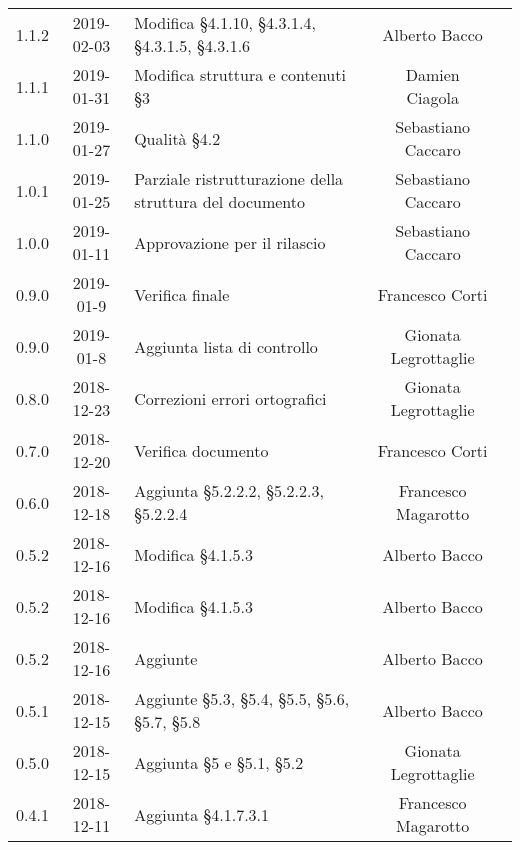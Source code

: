 {\begin{longtable}{ c c C{4cm} c c }
		1.1.2 & 2019-02-03 & Modifica §4.1.10, §4.3.1.4, §4.3.1.5, §4.3.1.6 & Alberto Bacco& \reda{} \\	
		
		1.1.1 & 2019-01-31 & Modifica struttura e contenuti §3 & Damien Ciagola & \reda{} \\	
		
		1.1.0 & 2019-01-27 & Qualità §4.2 & Sebastiano Caccaro & \reda{} \\	
		
		1.0.1 & 2019-01-25 & Parziale ristrutturazione della struttura del documento & Sebastiano Caccaro & \reda{} \\		
		
		1.0.0 & 2019-01-11 & Approvazione per il rilascio & Sebastiano Caccaro & \Res{} \\
		
		0.9.0 & 2019-01-9 & Verifica finale & Francesco Corti & \ver{} \\
		
		0.9.0 & 2019-01-8 & Aggiunta lista di controllo & Gionata Legrottaglie & \reda{} \\
		
		0.8.0 & 2018-12-23 & Correzioni errori ortografici & Gionata Legrottaglie & \reda{} \\
		
		0.7.0 & 2018-12-20 & Verifica documento & Francesco Corti & \ver{}\\
		
		0.6.0 & 2018-12-18 & Aggiunta §5.2.2.2, §5.2.2.3, §5.2.2.4 & Francesco Magarotto & \reda{} \\
		
		0.5.2 & 2018-12-16 & Modifica §4.1.5.3 & Alberto Bacco & \reda{} \\
		
		0.5.2 & 2018-12-16 & Modifica §4.1.5.3 & Alberto Bacco & \reda{} \\
		
		0.5.2 & 2018-12-16 & Aggiunte  & Alberto Bacco & \reda{} \\
		
		0.5.1 & 2018-12-15 & Aggiunte §5.3, §5.4, §5.5, §5.6, §5.7, §5.8 & Alberto Bacco & \reda{} \\
		
		0.5.0 & 2018-12-15 & Aggiunta §5 e §5.1, §5.2 & Gionata Legrottaglie & \reda{} \\
		
		0.4.1 & 2018-12-11 & Aggiunta §4.1.7.3.1 & Francesco Magarotto & \reda{} \\ 
		

\end{longtable}}
